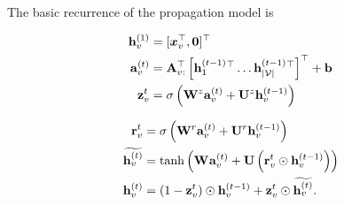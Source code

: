 \documentclass{article} %
\begin{document}
The basic recurrence of the propagation model is 
\begin{center}
\small
\begin{minipage}{.48\linewidth}
\begin{align}
    \mathbf{h}_{v}^{(1)} & = [\boldsymbol{x}_v^\top, \mathbf{0}]^\top \label{eq:init}\\
    \mathbf{a}_{v}^{(t)} & = 
    \mathbf{A}_{v:}^\top  \left[\mathbf{h}_{1}^{(t-1)}{}^\top \ldots
\mathbf{h}_{|\mathcal{V}|}^{(t-1)}{}^\top\right]^\top + \mathbf{b} \label{eq:propagate-A} \\
    \mathbf{z}_{v}^{t} & =
    \sigma\left(\mathbf{W}_{}^{z}\mathbf{a}_{v}^{(t)} +
    \mathbf{U}^{z}\mathbf{h}_{v}^{(t-1)}\right) \label{eq:update-gate}
\end{align}
\end{minipage}
\hfill
\begin{minipage}{.48\linewidth}
\begin{align}
    \mathbf{r}_{v}^{t} & =
    \sigma\left(\mathbf{W}_{}^{r}\mathbf{a}_{v}^{(t)} +
    \mathbf{U}^{r}\mathbf{h}_{v}^{(t-1)}\right) \label{eq:reset-gate} \\
    \widetilde{\mathbf{h}_{v}^{(t)}} & =
    \mathrm{tanh}\left(\mathbf{W}_{}\mathbf{a}_{v}^{(t)} +
    \mathbf{U}\left(\mathbf{r}_{v}^{t}\odot\mathbf{h}_{v}^{(t-1)}\right)\right)
    \\
    \mathbf{h}_{v}^{(t)} & = (1 - \mathbf{z}_{v}^{t})\odot
    \mathbf{h}_{v}^{(t-1)} + \mathbf{z}_{v}^{t}\odot
    \widetilde{\mathbf{h}_{v}^{(t)}}.
\end{align}
\end{minipage}
\end{center}
\end{document}
